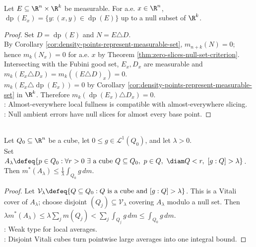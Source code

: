 \begin{corollary} \label{cor:density-points-commute-with-slices} \\
Let $E\subseteq\R^n\times\R^k$ be measurable. For a.e. $x\in\R^n$, $\operatorname{dp}(E_x)=\{y:(x,y)\in\operatorname{dp}(E)\}$ up to a null subset of $\R^k$.
\begin{proof}
Set $D=\operatorname{dp}(E)$ and $N=E\triangle D$.\\
By Corollary \ref{cor:density-points-represent-measurable-set}, $m_{n+k}(N)=0$; hence $m_k(N_x)=0$ for a.e. $x$ by Theorem \ref{thm:zero-slices-null-set-criterion}.\\
Intersecting with the Fubini good set, $E_x,D_x$ are measurable and $m_k(E_x\triangle D_x)=m_k((E\triangle D)_x)=0$.\\
$m_k(E_x\triangle\operatorname{dp}(E_x))=0$ by Corollary \ref{cor:density-points-represent-measurable-set} in $\R^k$. Therefore $m_k(\operatorname{dp}(E_x)\triangle D_x)=0$.\\
: Almost-everywhere local fullness is compatible with almost-everywhere slicing.\\
: Null ambient errors have null slices for almost every base point.
\end{proof}
\end{corollary}

\begin{lemma} \label{lem:large-average-set-bound} \\
Let $Q_0\subseteq\R^n$ be a cube, let $0\leq g\in\mathscr{L}^1(Q_0)$, and let $\lambda>0$.\\
Set $A_\lambda\defeq\{p\in Q_0:\forall r>0\ \exists\text{ a cube }Q\subseteq Q_0,\ p\in Q,\ \diam Q<r,\ [g:Q]>\lambda\}$. Then $m^\ast(A_\lambda)\leq\frac{1}{\lambda}\int_{Q_0}g\,dm$.
\begin{proof}
Let $\mathcal{V}_\lambda\defeq\{Q\subseteq Q_0:Q\text{ is a cube and }[g:Q]>\lambda\}$. This is a Vitali cover of $A_\lambda$; choose disjoint $(Q_j)\subseteq\mathcal{V}_\lambda$ covering $A_\lambda$ modulo a null set. Then $\lambda m^\ast(A_\lambda)\leq\lambda\sum\limits_jm(Q_j)<\sum\limits_j\int_{Q_j}g\,dm\leq\int_{Q_0}g\,dm$.\\
: Weak type for local averages.\\
: Disjoint Vitali cubes turn pointwise large averages into one integral bound.
\end{proof}
\end{lemma}

